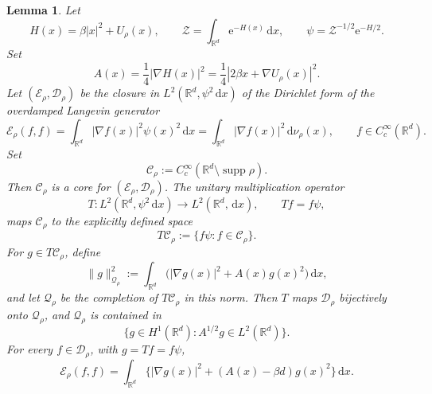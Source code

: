 \documentclass[12pt,reqno,letterpaper]{amsart}
\newtheorem{lemma}[theorem]{Lemma}
\theoremstyle{definition}
\theoremstyle{remark}
\numberwithin{equation}{section}
\newcommand{\R}{\mathbb R}
\newcommand{\dd}{\,\mathrm d}
\newcommand{\ee}{\mathrm e}
\newcommand{\be}{\beta}
\newcommand{\cE}{\mathcal E}
\newcommand{\cD}{\mathcal D}
\begin{document}
\begin{lemma}
\label{lem:singular-transform}
Let
\begin{equation*}
 H(x)=\be|x|^2+U_{\rho}(x),
 \qquad
 \mathcal Z=\int_{\R^d}\ee^{-H(x)}\dd x,
 \qquad
 \psi=\mathcal Z^{-1/2}\ee^{-H/2}.
\end{equation*}
Set
\[
 A(x)=\frac14|\nabla H(x)|^2
 =\frac14|2\be x+\nabla U_{\rho}(x)|^2.
\]
Let \((\cE_\rho,\cD_\rho)\) be the closure in
\(L^2(\R^d,\psi^2\dd x)\) of the Dirichlet form of the overdamped Langevin generator
\begin{equation*}
 \cE_\rho(f,f)=\int_{\R^d}|\nabla f(x)|^2\psi(x)^2\dd x = \int_{\mathbb R^d} \vert \nabla f(x)\vert^2 \dd \nu_{\rho}(x),
 \qquad f\in C_c^\infty(\R^d).
\end{equation*}
Set
\[
 \mathcal C_\rho:=C_c^\infty(\R^d\setminus\operatorname{supp}\rho).
\]
Then \(\mathcal C_\rho\) is a core for \((\cE_\rho,\cD_\rho)\).  The
unitary multiplication operator
\[
 T:L^2(\R^d,\psi^2\dd x)\longrightarrow L^2(\R^d,\dd x),
 \qquad Tf=f\psi,
\]
maps \(\mathcal C_\rho\) to the explicitly defined space
\[
 T\mathcal C_\rho:=\{f\psi:f\in\mathcal C_\rho\}.
\]
For \(g\in T\mathcal C_\rho\), define
\begin{equation}\label{eq:transformed-positive-norm}
 \|g\|_{\mathcal Q_\rho}^2
 :=\int_{\R^d}\bigl(|\nabla g(x)|^2+A(x)g(x)^2\bigr)\dd x,
\end{equation}
and let \(\mathcal Q_\rho\) be the completion of \(T\mathcal C_\rho\) in
this norm.  Then \(T\) maps \(\cD_\rho\) bijectively onto
\(\mathcal Q_\rho\), and \(\mathcal Q_\rho\) is contained in
\begin{equation}\label{eq:transformed-domain-inclusion}
 \{g\in H^1(\R^d):A^{1/2}g\in L^2(\R^d)\}.
\end{equation}
For every \(f\in\cD_\rho\), with \(g=Tf=f\psi\),
\begin{equation}\label{eq:closed-transform}
 \cE_\rho(f,f)
 =\int_{\R^d}\bigl\{|\nabla g(x)|^2+
   (A(x)-\be d)g(x)^2\bigr\}\dd x.
\end{equation}
\end{lemma}
\end{document}
